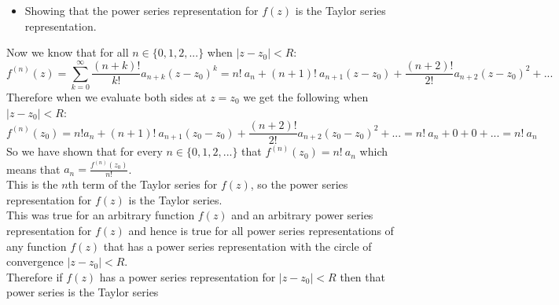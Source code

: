 \documentclass{article}
\begin{document}
\begin{itemize}
    \item Showing that the power series representation for $f(z)$ is the Taylor series representation.
\end{itemize}
\begin{center}
    \doublespacing
    Now we know that for all $n\in\{0, 1, 2, ...\}$ when $|z - z_0| < R$:
    \[f^{(n)} (z) =\sum _{k=0}^{\infty}\frac{(n + k)!}{k!} a_{n+k} (z - z_0)^k = n!\:a_n + (n + 1)!\:a_{n+1} (z - z_0) +\frac{(n + 2)!}{2!} a_{n+2} (z - z_0)^2 + ...\]
    Therefore when we evaluate both sides at $z = z_0$ we get the following when $|z - z_0| < R$:
    \[f^{(n)} (z_0) = n! a_n + (n + 1)!\:a_{n+1} (z_0 - z_0) +\frac{(n + 2)!}{2!} a_{n+2} (z_0 - z_0)^2 + ... = n!\:a_n + 0 + 0 + ... = n!\:a_n\]
    So we have shown that for every $n\in\{0, 1, 2, ...\}$ that $f^{(n)} (z_0) = n!\:a_n$ which means that $a_n =\frac{f^{(n)} (z_0)}{n!}$.
    \break
    \\This is the $n$th term of the Taylor series for $f(z)$, so the power series representation for $f(z)$ is the Taylor series.
    \\This was true for an arbitrary function $f(z)$ and an arbitrary power series representation for $f(z)$ and hence is true for all power series representations of any function $f(z)$ that has a power series representation with the circle of convergence $|z - z_0| < R$.
    \break
    \\Therefore if $f(z)$ has a power series representation for $|z - z_0| < R$ then that power series is the Taylor series \qedsymbol
\end{center}


\newpage
\end{document}
